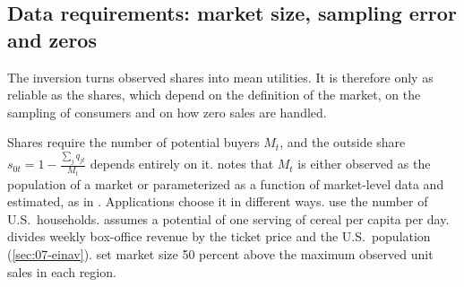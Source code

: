 \subsection{Data requirements: market size, sampling error and zeros}\label{sec:07-market-size}

The inversion turns observed shares into mean utilities. It is therefore only as reliable as the shares,
which depend on the definition of the market, on the sampling of consumers and on how zero sales are handled.

Shares require the number of potential buyers $M_t$, and the outside share $s_{0t} = 1 - \frac{\sum_j
q_{jt}}{M_t}$ depends entirely on it. \citet[p.~247]{Berry1994} notes that $M_t$ is either observed as the
population of a market or parameterized as a function of market-level data and estimated, as in
\citet{Berry1990}. Applications choose it in different ways. \citet[p.~869]{BerryLevinsohnPakes1995} use the
number of U.S.\ households. \citet[p.~337]{Nevo2001} assumes a potential of one serving of cereal per capita per
day. \citet{Einav2007} divides weekly box-office revenue by the ticket price and the U.S.\ population
(\cref{sec:07-einav}). \citet[p.~1774]{MillerWeinberg2017} set market size 50 percent above the maximum
observed unit sales in each region.

